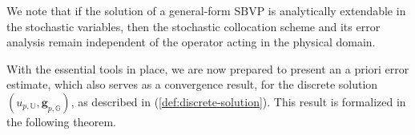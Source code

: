 \documentclass[final,onefignum,onetabnum]{mousaviart}
\begin{document}
				
				\vspace*{1mm}
		\begin{remark}
		\label{rem:analytic-solution}
			We note that if the solution of a general-form SBVP is analytically extendable in the stochastic variables, then the stochastic collocation scheme and its error analysis remain independent of the operator acting in the physical domain.
		\end{remark}
			
		\vspace*{1mm}
			With the essential tools in place, we are now prepared to present an a priori error estimate, which also serves as a convergence result, for the discrete solution $(u_{p,\mathbb{U}}, \boldsymbol{g}_{p,\mathbb{G}})$, as described in (\ref{def:discrete-solution}). This result is formalized in the following theorem.
			
\end{document}
